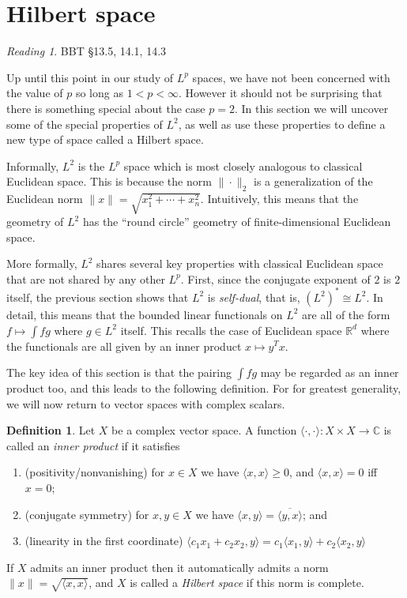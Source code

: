 \documentclass[11pt,oneside]{amsbook}
\newcommand{\RR}{{\mathbb R}}
\newcommand{\CC}{{\mathbb C}}
\theoremstyle{definition}
\theoremstyle{plain}
\theoremstyle{definition}
\newtheorem{defn}[thm]{Definition}
\theoremstyle{remark}
\newtheorem*{reading}{Reading}
\numberwithin{equation}{section}
\numberwithin{figure}{section}
\begin{document}
\newpage
\section{Hilbert space}

\begin{reading}
  BBT \S 13.5, 14.1, 14.3
\end{reading}


Up until this point in our study of $L^p$ spaces, we have not been concerned with the value of $p$ so long as $1<p<\infty$. However it should not be surprising that there is something special about the case $p=2$. In this section we will uncover some of the special properties of $L^2$, as well as use these properties to define a new type of space called a Hilbert space.

Informally, $L^2$ is the $L^p$ space which is most closely analogous to classical Euclidean space. This is because the norm $\|\cdot\|_2$ is a generalization of the Euclidean norm $\|x\|=\sqrt{x_1^2+\cdots+x_n^2}$. Intuitively, this means that the geometry of $L^2$ has the ``round circle'' geometry of finite-dimensional Euclidean space.

More formally, $L^2$ shares several key properties with classical Euclidean space that are not shared by any other $L^p$. First, since the conjugate exponent of $2$ is $2$ itself, the previous section shows that $L^2$ is \emph{self-dual}, that is, $(L^2)^*\cong L^2$. In detail, this means that the bounded linear functionals on $L^2$ are all of the form $f\mapsto\int fg$ where $g\in L^2$ itself. This recalls the case of Euclidean space $\RR^d$ where the functionals are all given by an inner product $x\mapsto y^Tx$.

The key idea of this section is that the pairing $\int fg$ may be regarded as an inner product too, and this leads to the following definition. For for greatest generality, we will now return to vector spaces with complex scalars.

\begin{defn}
  Let $X$ be a complex vector space. A function $\langle\cdot,\cdot\rangle\colon X\times X\to\CC$ is called an \emph{inner product} if it satisfies
  \begin{enumerate}
  \item (positivity/nonvanishing) for $x\in X$ we have $\langle x,x\rangle\geq0$, and $\langle x,x\rangle=0$ iff $x=0$;
  \item (conjugate symmetry) for $x,y\in X$ we have $\langle x,y\rangle=\overline{\langle y,x\rangle}$; and
  \item (linearity in the first coordinate) $\langle c_1x_1+c_2x_2,y\rangle=c_1\langle x_1,y\rangle+c_2\langle x_2,y\rangle$
  \end{enumerate}
  If $X$ admits an inner product then it automatically admits a norm $\|x\|=\sqrt{\langle x,x\rangle}$, and $X$ is called a \emph{Hilbert space} if this norm is complete.
\end{defn}
\end{document}
